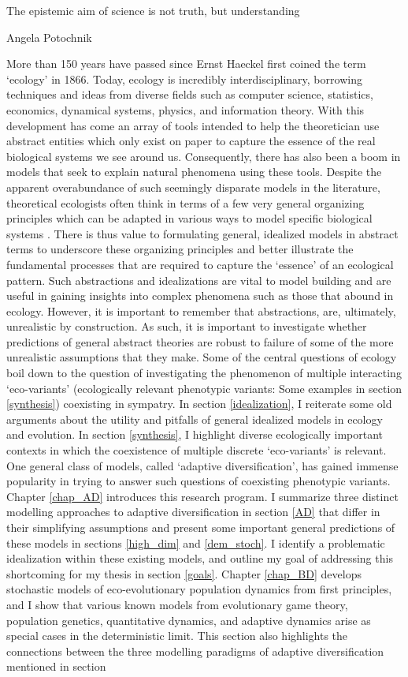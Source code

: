 \epigraph{\justifying The epistemic aim of science is not truth, but understanding}{Angela Potochnik}

More than 150 years have passed since Ernst Haeckel first coined the term ‘ecology’ in 1866. Today, ecology is incredibly interdisciplinary, borrowing techniques and ideas from diverse fields such as computer science, statistics, economics, dynamical systems, physics, and information theory. With this development has come an array of tools intended to help the theoretician use abstract entities which only exist on paper to capture the essence of the real biological systems we see around us. Consequently, there has also been a boom in models that seek to explain natural phenomena using these tools. Despite the apparent overabundance of such seemingly disparate models in the literature, theoretical ecologists often think in terms of a few very general organizing principles which can be adapted in various ways to model specific biological systems \citep{vellend_theory_2016}. There is thus value to formulating general, idealized models in abstract terms to underscore these organizing principles and better illustrate the fundamental processes that are required to capture the `essence' of an ecological pattern. Such abstractions and idealizations are vital to model building and are useful in gaining insights into complex phenomena such as those that abound in ecology. However, it is important to remember that abstractions, are, ultimately, unrealistic by construction. As such, it is important to investigate whether predictions of general abstract theories are robust to failure of some of the more unrealistic assumptions that they make. Some of the central questions of ecology boil down to the question of investigating the phenomenon of multiple interacting ‘eco-variants’ (ecologically relevant phenotypic variants: Some examples in section \ref{synthesis}) coexisting in sympatry. In section \ref{idealization}, I reiterate some old arguments about the utility and pitfalls of general idealized models in ecology and evolution. In section \ref{synthesis}, I highlight diverse ecologically important contexts in which the coexistence of multiple discrete `eco-variants' is relevant. One general class of models, called `adaptive diversification', has gained immense popularity in trying to answer such questions of coexisting phenotypic variants. Chapter \ref{chap_AD} introduces this research program. I summarize three distinct modelling approaches to adaptive diversification in section \ref{AD} that differ in their simplifying assumptions and present some important general predictions of these models in sections \ref{high_dim} and \ref{dem_stoch}. I identify a problematic idealization within these existing models, and outline my goal of addressing this shortcoming for my thesis in section \ref{goals}. Chapter \ref{chap_BD} develops stochastic models of eco-evolutionary population dynamics from first principles, and I show that various known models from evolutionary game theory, population genetics, quantitative dynamics, and adaptive dynamics arise as special cases in the deterministic limit. This section also highlights the connections between the three modelling paradigms of adaptive diversification mentioned in section 